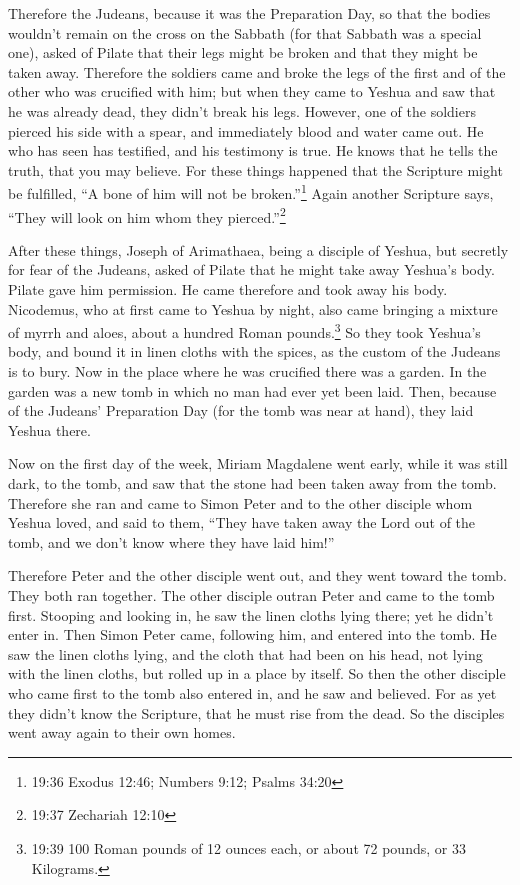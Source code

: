 \myverse{}Therefore the Judeans, because it was the Preparation Day, so
that the bodies wouldn’t remain on the cross on the Sabbath (for that Sabbath was a special one), asked
of Pilate that their legs might be broken and that they might be taken away.
\myverse{}Therefore the soldiers came and broke the legs of the first and of the other
who was crucified with him;
\myverse{}but when they came to Yeshua and saw that he was already dead, they didn’t
break his legs.
\myverse{}However, one of the soldiers pierced his side with a spear, and immediately
blood and water came out.
\myverse{}He who has seen has testified, and his testimony is true. He knows that he
tells the truth, that you may believe.
\myverse{}For these things happened that the Scripture might be fulfilled, “A bone
of him will not be broken.”\footnote{19:36 Exodus 12:46;
	Numbers 9:12;
	Psalms 34:20
}
\myverse{}Again another Scripture says, “They will look on him whom they pierced.”\footnote{19:37 Zechariah 12:10}

\myverse{}After these things, Joseph of Arimathaea, being a disciple of
Yeshua, but secretly for fear of the Judeans, asked of Pilate that he might take away Yeshua’s body. Pilate
gave him permission. He came therefore and took away his body.
\myverse{}Nicodemus, who at first came to Yeshua by night, also came bringing a mixture
of myrrh and aloes, about a hundred Roman pounds.\footnote{19:39 100 Roman pounds of 12 ounces each, or about 72 pounds, or 33 Kilograms.}
\myverse{}So they took Yeshua’s body, and bound it in linen cloths with the spices,
as the custom of the Judeans is to bury.
\myverse{}Now in the place where he was crucified there was a garden. In the garden
was a new tomb in which no man had ever yet been laid.
\myverse{}Then, because of the Judeans’ Preparation Day (for the tomb was near at hand),
they laid Yeshua there.


\mychapter{} \myverse*{}Now on the first day of the week, Miriam Magdalene went early,
while it was still dark, to the tomb, and saw that the stone had been taken away from the tomb.
\myverse{}Therefore she ran and came to Simon Peter and to the other disciple whom Yeshua
loved, and said to them, “They have taken away the Lord out of the tomb, and we don’t know where they
have laid him!”

\myverse{}Therefore Peter and the other disciple went out, and they went
toward the tomb.
\myverse{}They both ran together. The other disciple outran Peter and came to the tomb
first.
\myverse{}Stooping and looking in, he saw the linen cloths lying there; yet he didn’t
enter in.
\myverse{}Then Simon Peter came, following him, and entered into the tomb. He saw the
linen cloths lying,
\myverse{}and the cloth that had been on his head, not lying with the linen cloths, but
rolled up in a place by itself.
\myverse{}So then the other disciple who came first to the tomb also entered in, and
he saw and believed.
\myverse{}For as yet they didn’t know the Scripture, that he must rise from the dead.
\myverse{}So the disciples went away again to their own homes.

